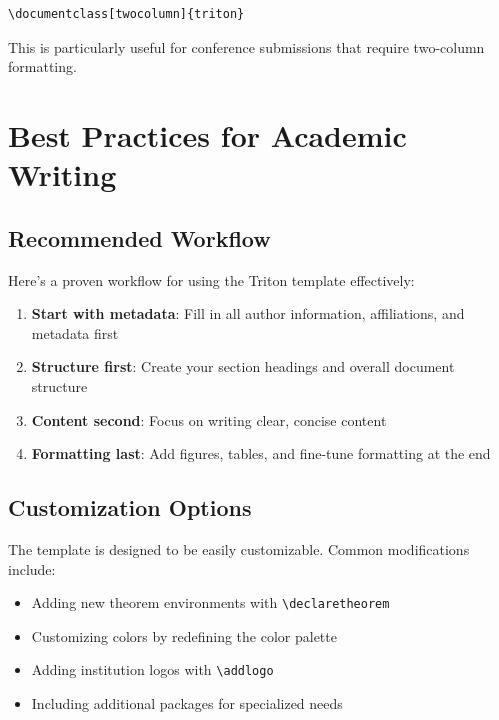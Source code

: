 \documentclass{triton}
\begin{document}
\begin{tcolorbox}[colback=ucsdnavy!10,colframe=ucsdnavy,title=Two-Column Mode]
\begin{verbatim}
\documentclass[twocolumn]{triton}
\end{verbatim}
\end{tcolorbox}

This is particularly useful for conference submissions that require two-column formatting.

\section{Best Practices for Academic Writing}

\subsection{Recommended Workflow}

Here's a proven workflow for using the Triton template effectively:

\begin{enumerate}
    \item \textbf{Start with metadata}: Fill in all author information, affiliations, and metadata first
    \item \textbf{Structure first}: Create your section headings and overall document structure
    \item \textbf{Content second}: Focus on writing clear, concise content
    \item \textbf{Formatting last}: Add figures, tables, and fine-tune formatting at the end
\end{enumerate}

\subsection{Customization Options}

The template is designed to be easily customizable. Common modifications include:

\begin{itemize}
    \item Adding new theorem environments with \verb|\declaretheorem|
    \item Customizing colors by redefining the color palette
    \item Adding institution logos with \verb|\addlogo|
    \item Including additional packages for specialized needs
\end{itemize}
\end{document}

